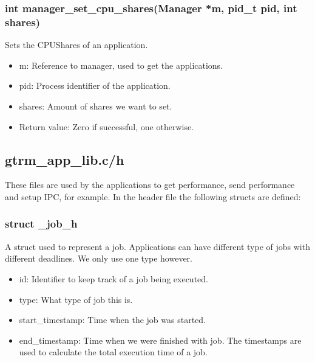 \documentclass[nobiblatex]{LTHthesis}
\begin{document}
\subsubsection{int manager\_set\_cpu\_shares(Manager *m, pid\_t pid, int shares)}
Sets the CPUShares of an application.
\begin{itemize}
\item m: Reference to manager, used to get the applications.
\item pid: Process identifier of the application.
\item shares: Amount of shares we want to set.
\item Return value: Zero if successful, one otherwise.
\end{itemize}

\subsection{gtrm\_app\_lib.c/h}
These files are used by the applications to get performance, send performance and setup IPC, for example.
In the header file the following structs are defined:
\subsubsection{struct \_job\_h}
A struct used to represent a job. Applications can have different type of jobs with different deadlines. We only use one type however.
\begin{itemize}
\item id: Identifier to keep track of a job being executed.
\item type: What type of job this is.
\item start\_timestamp: Time when the job was started.
\item end\_timestamp: Time when we were finished with job. The timestamps are used to calculate the total execution time of a job.
\end{itemize}
\end{document}
